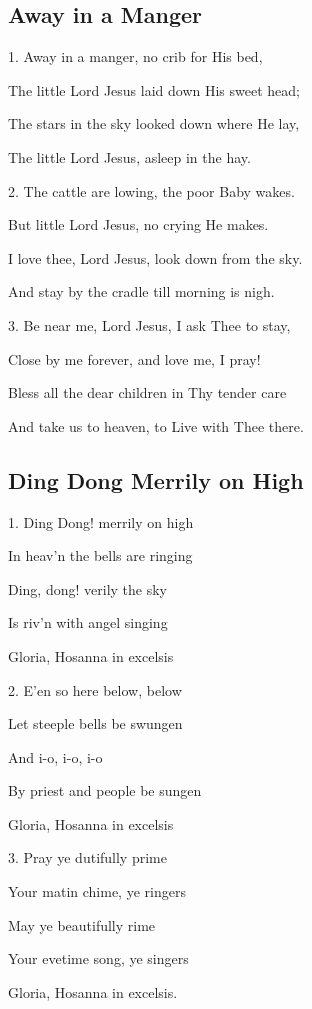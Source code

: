 \subsection{Away in a Manger}\label{away_in}
\begin{description}[nosep,leftmargin=\parindent,labelsep=0pt]
\item 1. Away in a manger, no crib for His bed, 
\item The little Lord Jesus laid down His sweet head; 
\item The stars in the sky looked down where He lay, 
\item The little Lord Jesus, asleep in the hay. 
\vspace{1.5ex}
\item 2. The cattle are lowing, the poor Baby wakes. 
\item But little Lord Jesus, no crying He makes. 
\item I love thee, Lord Jesus, look down from the sky. 
\item And stay by the cradle till morning is nigh. 
\vspace{1.5ex}
\item 3. Be near me, Lord Jesus, I ask Thee to stay, 
\item Close by me forever, and love me, I pray! 
\item Bless all the dear children in Thy tender care 
\item And take us to heaven, to Live with Thee there. 
\end{description}
\subsection{Ding Dong Merrily on High}\label{ding_dong}
\begin{description}[nosep,leftmargin=\parindent,labelsep=0pt]
\item 1. Ding Dong! merrily on high 
\item In heav'n the bells are ringing 
\item Ding, dong! verily the sky 
\item Is riv'n with angel singing 
\item Gloria, Hosanna in excelsis 
\vspace{1.5ex}
\item 2. E'en so here below, below 
\item Let steeple bells be swungen 
\item And i-o, i-o, i-o 
\item By priest and people be sungen 
\item Gloria, Hosanna in excelsis 
\vspace{1.5ex}
\item 3. Pray ye dutifully prime 
\item Your matin chime, ye ringers 
\item May ye beautifully rime 
\item Your evetime song, ye singers 
\item Gloria, Hosanna in excelsis. 
\end{description}
